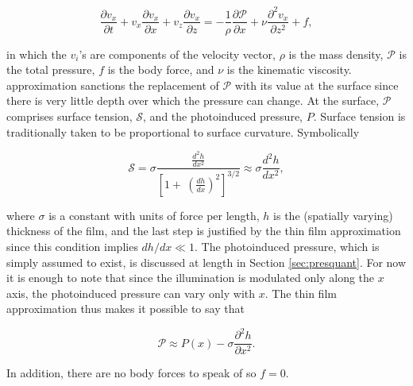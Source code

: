 \documentclass[twocolumn,showpacs,preprintnumbers,amsmath,amssymb]{revtex4}
\begin{document}
\begin{equation}
\frac{\partial v_x}{\partial t}+v_x\frac{\partial v_x}{\partial x} +v_z\frac{\partial
v_x}{\partial z} = - \frac{1}{\rho}\frac{\partial \mathcal{P}}{\partial
x}+\nu\frac{\partial^2 v_x}{\partial z^2}+f \mathrm{,} \label{eq:levstokes}
\end{equation}

in which the $v_i$'s are components of the velocity vector, $\rho$ is
the mass density, $\mathcal{P}$ is the total pressure, $f$ is the body
force, and $\nu$ is the kinematic viscosity. %
approximation sanctions the replacement of $\mathcal{P}$ with its
value at the surface since there is very little depth over which the
pressure can change. At the surface, $\mathcal{P}$ comprises surface
tension, $\mathcal{S}$, and the photoinduced pressure, $P$. Surface
tension is traditionally taken to be proportional to surface
curvature. Symbolically

\begin{equation}
\mathcal{S}= \sigma \frac{\frac{d^2h}{dx^2}}{\left[1+\
\left(\frac{dh}{dx}\right)^2\right]^{3/2}}\approx \sigma \frac{d^2h}{dx^2} \mathrm{,}
\label{eq:surften}
\end{equation}

where $\sigma$ is a constant with units of force per length, $h$ is
the (spatially varying) thickness of the film, and the last step is
justified by the thin film approximation since this condition implies
$dh/dx\ll 1$. The photoinduced pressure, which is simply assumed to
exist, is discussed at length in Section \ref{sec:presquant}. For now
it is enough to note that since the illumination is modulated only
along the $x$ axis, the photoinduced pressure can vary only with
$x$. The thin film approximation thus makes it possible to say that

\begin{equation}
\mathcal{P} \approx P(x)-\sigma\frac{\partial^2 h}{\partial x^2} \mathrm{.}
\end{equation}

In addition, there are no body forces to speak of so $f=0$.
\end{document}
